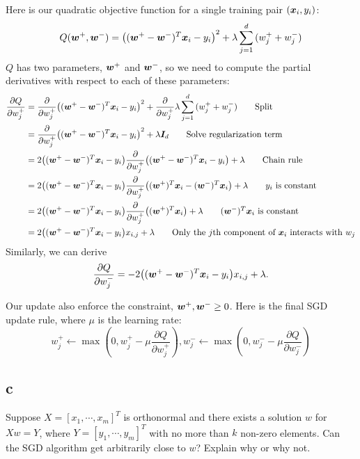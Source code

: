 \documentclass{article}
\begin{document}
Here is our quadratic objective function for a single training pair $(\bm{x}_i, y_i)$:
$$Q(\vct{w}^{+}, \vct{w}^{-}) = \left((\vct{w}^{+} - \vct{w}^{-})^T\vct{x}_i - y_i\right)^2 + \lambda\sum_{j=1}^d{(w_j^{+} + w_j^{-})}$$
$Q$ has two parameters, $\bm{w}^{+}$ and $\bm{w}^{-}$, so we need to compute the partial derivatives with respect to each of these parameters:
\begin{align*}
    \frac{\partial Q}{\partial w^{+}_j} &= \frac{\partial}{\partial w^{+}_j}\left((\vct{w}^{+} - \vct{w}^{-})^T\vct{x}_i - y_i\right)^2 + \frac{\partial}{\partial w^{+}_j}\lambda\sum_{j=1}^d{(w_j^{+} + w_j^{-})}\tag*{Split}\\
    &= \frac{\partial}{\partial w^{+}_j}\left((\vct{w}^{+} - \vct{w}^{-})^T\vct{x}_i - y_i\right)^2 + \lambda \vct{I}_d\tag*{Solve regularization term}\\
    &=2\left((\vct{w}^{+} - \vct{w}^{-})^T\vct{x}_i - y_i\right)\frac{\partial}{\partial w^{+}_j}\left((\vct{w}^{+} - \vct{w}^{-})^T\vct{x}_i - y_i\right) + \lambda\tag*{Chain rule}\\
    &=2\left((\vct{w}^{+} - \vct{w}^{-})^T\vct{x}_i - y_i\right)\frac{\partial}{\partial w^{+}_j}\left((\vct{w}^{+})^T\vct{x}_i - (\vct{w}^{-})^T\vct{x}_i\right) + \lambda\tag*{$y_i$ is constant}\\
    &=2\left((\vct{w}^{+} - \vct{w}^{-})^T\vct{x}_i - y_i\right)\frac{\partial}{\partial w^{+}_j}\left((\vct{w}^{+})^T\vct{x}_i\right) + \lambda\tag*{$(\vct{w}^{-})^T\vct{x}_i$ is constant}\\
    &= 2\left((\vct{w}^{+} - \vct{w}^{-})^T\vct{x}_i - y_i\right)x_{i,j} + \lambda\tag*{Only the $j$th component of $\vct{x}_i$ interacts with $w_j$}
\end{align*}
Similarly, we can derive
$$\frac{\partial Q}{\partial w^{-}_j} = -2\left((\vct{w}^{+} - \vct{w}^{-})^T\vct{x}_i - y_i\right)x_{i,j} + \lambda.$$

Our update also enforce the constraint, $\bm{w}^{+}, \bm{w}^{-} \geq 0$.
Here is the final SGD update rule, where $\mu$ is the learning rate:
$$w^{+}_j \leftarrow \max\left(0, w^{+}_j - \mu\frac{\partial Q}{\partial w^{+}_j}\right), w^{-}_j \leftarrow \max\left(0, w^{-}_j - \mu\frac{\partial Q}{\partial w^{-}_j}\right)$$

\subsection{c}
Suppose $X = [x_1, \cdots, x_m]^T$ is orthonormal and there exists a solution $w$ for $Xw = Y$, where $Y = [y_1, \cdots, y_m]^T$ with no more than $k$ non-zero elements.
Can the SGD algorithm get arbitrarily close to $w$?
Explain why or why not.
\end{document}
